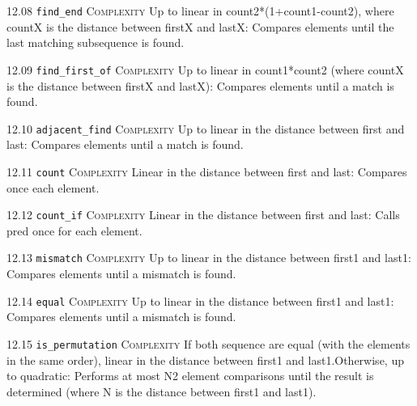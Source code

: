 \noindent\textcolor{corange}{12.08 \texttt{find\_end}} \textsc{Complexity} Up to linear in count2*(1+count1-count2), where countX is the distance between firstX and lastX: Compares elements until the last matching subsequence is found. \vspace{0.5em}

\noindent\textcolor{corange}{12.09 \texttt{find\_first\_of}} \textsc{Complexity} Up to linear in count1*count2 (where countX is the distance between firstX and lastX): Compares elements until a match is found. \vspace{0.5em}

\noindent\textcolor{corange}{12.10 \texttt{adjacent\_find}} \textsc{Complexity} Up to linear in the distance between first and last: Compares elements until a match is found. \vspace{0.5em}

\noindent\textcolor{corange}{12.11 \texttt{count}} \textsc{Complexity} Linear in the distance between first and last: Compares once each element. \vspace{0.5em}

\noindent\textcolor{corange}{12.12 \texttt{count\_if}} \textsc{Complexity} Linear in the distance between first and last: Calls pred once for each element. \vspace{0.5em}

\noindent\textcolor{corange}{12.13 \texttt{mismatch}} \textsc{Complexity} Up to linear in the distance between first1 and last1: Compares elements until a mismatch is found. \vspace{0.5em}

\noindent\textcolor{corange}{12.14 \texttt{equal}} \textsc{Complexity} Up to linear in the distance between first1 and last1: Compares elements until a mismatch is found. \vspace{0.5em}

\noindent\textcolor{corange}{12.15 \texttt{is\_permutation}} \textsc{Complexity} If both sequence are equal (with the elements in the same order), linear in the distance between first1 and last1.Otherwise, up to quadratic: Performs at most N2 element comparisons until the result is determined (where N is the distance between first1 and last1). \vspace{0.5em}

